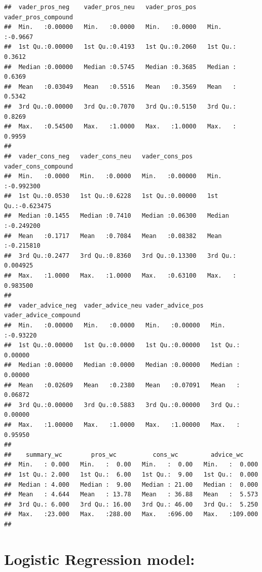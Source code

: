 \documentclass[
]{article}
\begin{document}
\begin{verbatim}
##  vader_pros_neg    vader_pros_neu   vader_pros_pos   vader_pros_compound
##  Min.   :0.00000   Min.   :0.0000   Min.   :0.0000   Min.   :-0.9667    
##  1st Qu.:0.00000   1st Qu.:0.4193   1st Qu.:0.2060   1st Qu.: 0.3612    
##  Median :0.00000   Median :0.5745   Median :0.3685   Median : 0.6369    
##  Mean   :0.03049   Mean   :0.5516   Mean   :0.3569   Mean   : 0.5342    
##  3rd Qu.:0.00000   3rd Qu.:0.7070   3rd Qu.:0.5150   3rd Qu.: 0.8269    
##  Max.   :0.54500   Max.   :1.0000   Max.   :1.0000   Max.   : 0.9959    
##                                                                         
##  vader_cons_neg   vader_cons_neu   vader_cons_pos    vader_cons_compound
##  Min.   :0.0000   Min.   :0.0000   Min.   :0.00000   Min.   :-0.992300  
##  1st Qu.:0.0530   1st Qu.:0.6228   1st Qu.:0.00000   1st Qu.:-0.623475  
##  Median :0.1455   Median :0.7410   Median :0.06300   Median :-0.249200  
##  Mean   :0.1717   Mean   :0.7084   Mean   :0.08382   Mean   :-0.215810  
##  3rd Qu.:0.2477   3rd Qu.:0.8360   3rd Qu.:0.13300   3rd Qu.: 0.004925  
##  Max.   :1.0000   Max.   :1.0000   Max.   :0.63100   Max.   : 0.983500  
##                                                                         
##  vader_advice_neg  vader_advice_neu vader_advice_pos  vader_advice_compound
##  Min.   :0.00000   Min.   :0.0000   Min.   :0.00000   Min.   :-0.93220     
##  1st Qu.:0.00000   1st Qu.:0.0000   1st Qu.:0.00000   1st Qu.: 0.00000     
##  Median :0.00000   Median :0.0000   Median :0.00000   Median : 0.00000     
##  Mean   :0.02609   Mean   :0.2380   Mean   :0.07091   Mean   : 0.06872     
##  3rd Qu.:0.00000   3rd Qu.:0.5883   3rd Qu.:0.00000   3rd Qu.: 0.00000     
##  Max.   :1.00000   Max.   :1.0000   Max.   :1.00000   Max.   : 0.95950     
##                                                                            
##    summary_wc        pros_wc          cons_wc         advice_wc      
##  Min.   : 0.000   Min.   :  0.00   Min.   :  0.00   Min.   :  0.000  
##  1st Qu.: 2.000   1st Qu.:  6.00   1st Qu.:  9.00   1st Qu.:  0.000  
##  Median : 4.000   Median :  9.00   Median : 21.00   Median :  0.000  
##  Mean   : 4.644   Mean   : 13.78   Mean   : 36.88   Mean   :  5.573  
##  3rd Qu.: 6.000   3rd Qu.: 16.00   3rd Qu.: 46.00   3rd Qu.:  5.250  
##  Max.   :23.000   Max.   :288.00   Max.   :696.00   Max.   :109.000  
## 
\end{verbatim}

\section{Logistic Regression model:}\label{logistic-regression-model}
\end{document}
